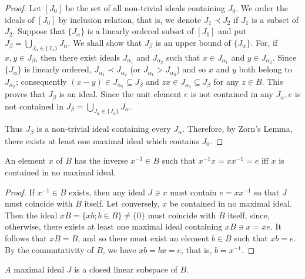 \begin{proof}
 Let $[J_0]$ be the set of all non-trivial ideals containing $J_0$. We order the ideals of $[J_0]$ by inclusion relation, that is, we denote $J_1 \prec J_2$ if $J_1$ is a subset of $J_2$. Suppose that $\{J_\alpha\}$ is a linearly ordered subset of $[J_0]$ and put $J_\beta = \bigcup\limits_{J_\alpha \in \{J_\alpha\}} J_\alpha$. We shall show that $J_\beta$ is an upper bound of $\{J_\alpha\}$. For, if $x, y \in J_\beta$, then there exist ideals $J_{\alpha_1}$ and $J_{\alpha_2}$ such that $x \in J_{\alpha_1}$ and $y \in J_{\alpha_2}$. Since $\{J_\alpha\}$ is linearly ordered, $J_{\alpha_1} \prec J_{\alpha_2}$ (or $J_{\alpha_1} > J_{\alpha_2}$) and so $x$ and $y$ both belong to $J_{\alpha_2}$; consequently $(x - y) \in J_{\alpha_2} \subseteq J_\beta$ and $zx \in J_{\alpha_2} \subseteq J_\beta$ for any $z \in B$. This proves that $J_\beta$ is an ideal. Since the unit element $e$ is not contained in any $J_\alpha, e$ is not contained in $J_\beta = \bigcup\limits_{J_\alpha \in \{J_\alpha\}} J_\alpha$. 

Thus $J_{\beta}$ is a non-trivial ideal containing every $J_{\alpha}$. Therefore, by Zorn's Lemma, there exists at least one maximal ideal which contains $J_{0}$. 
\end{proof}

\begin{corollaryu} An element $x$ of $B$ has the inverse $x^{-1} \in B$ such that $x^{-1}x = xx^{-1} = e$ iff $x$ is contained in no maximal ideal. 
\end{corollaryu}

\begin{proof}
 If $x^{-1} \in B$ exists, then any ideal $J \ni x$ must contain $e = xx^{-1}$ so that $J$ must coincide with $B$ itself. Let conversely, $x$ be contained in no maximal ideal. Then the ideal $xB = \{xb; b \in B\} \neq \{0\}$ must coincide with $B$ itself, since, otherwise, there exists at least one maximal ideal containing $xB \ni x = xe$. It follows that $xB = B$, and so there must exist an element $b \in B$ such that $xb = e$. By the commutativity of $B$, we have $xb = bx = e$, that is, $b = x^{-1}$. 
\end{proof}

\begin{proposition}\label{prop:XI.1.Proposition.2} $A$ maximal ideal $J$ is a closed linear subspace of $B$. 
\end{proposition}

